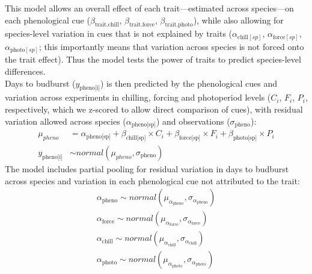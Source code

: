 \documentclass[11pt]{article}
\begin{document}
This model allows an overall effect of each trait---estimated across species---on each phenological cue ($\beta_{\text{trait}.\text{chill}}$, $\beta_{\text{trait}.\text{force}}$, $\beta_{\text{trait}.\text{photo}}$), while also allowing for species-level variation in cues that is not explained by traits ($\alpha_{\text{chill}[sp]} $, $\alpha_{\text{force}[sp]}$, $\alpha_{\text{photo}[sp]}$; this importantly means that variation across species is not forced onto the trait effect). Thus the model tests the power of traits to predict species-level differences.\\

Days to budburst ($y_{\text{pheno[i]}}$) is then predicted by the phenological cues and variation across experiments in chilling, forcing and photoperiod levels ($C_i$, $F_i$, $P_i$, respectively, which we z-scored to allow direct comparison of cues), with residual variation allowed across species ($\alpha_{\text{pheno[sp]}}$) and observations ($\sigma_{\text{pheno}}$):
\begin{align}
\mu_{pheno} & = \alpha_{\text{pheno[sp]}}+ \beta_{\text{chill[sp]}} \times C_i + \beta_{\text{force[sp]}}\times F_i + \beta_{\text{photo[sp]}} \times P_i\\
y_{\text{pheno[i]}} & \sim normal( \mu_{pheno}, \sigma_{\text{pheno}}) \nonumber 
\end{align}
The model includes partial pooling for residual variation in days to budburst across species and variation in each phenological cue not attributed to the trait:
\begin{align}
\alpha_{\text{pheno}} \sim normal(\mu_{\alpha_{\text{pheno}}},\sigma_{\alpha_{\text{pheno}}}) \\
\alpha_{\text{force}} \sim normal(\mu_{\alpha_{\text{force}}},\sigma_{\alpha_{\text{force}}}) \nonumber \\
\alpha_{\text{chill}} \sim normal(\mu_{\alpha_{\text{chill}}},\sigma_{\alpha_{\text{chill}}}) \nonumber \\
\alpha_{\text{photo}} \sim normal(\mu_{\alpha_{\text{photo}}},\sigma_{\alpha_{\text{photo}}}) \nonumber
\end{align}
\end{document}
